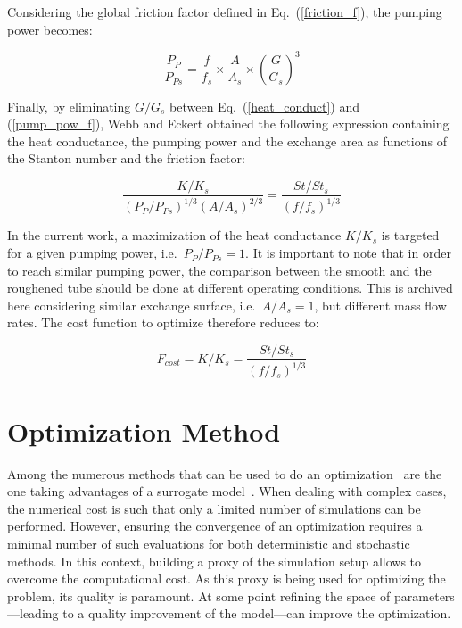 Considering the global friction factor defined in Eq.~(\ref{friction_f}), the pumping power becomes:

\begin{equation}
\frac{P_{P}}{P_{Ps}} = \frac{f}{f_s} \times \frac{A}{A_s} \times \left( \frac{G}{G_s} \right)^3
\label{pump_pow_f}
\end{equation}

Finally, by eliminating $G/G_s$ between Eq.~(\ref{heat_conduct}) and (\ref{pump_pow_f}), Webb and Eckert obtained the following expression containing the heat conductance, the pumping power and the exchange area as functions of the Stanton number and the friction factor:

\begin{equation}
\frac{K/K_s}{(P_{P}/P_{Ps})^{1/3}(A/A_s)^{2/3}} = \frac{St/St_s}{(f/f_s)^{1/3}}
\label{webb_eckert}
\end{equation}

In the current work, a maximization of the heat conductance $K/K_s$ is targeted for a given pumping power, i.e.~$P_{P}/P_{Ps}=1$. It is important to note that in order to reach similar pumping power, the comparison between the smooth and the roughened tube should be done at different operating conditions. This is archived here considering similar exchange surface, i.e.~$A/A_s=1$, but different mass flow rates. The cost function to optimize therefore reduces to:

\begin{equation}
F_{cost} = K/K_s = \frac{St/St_s}{(f/f_s)^{1/3}}
\label{cost_function}
\end{equation}

\section{Optimization Method}
\label{sec:optim_method}

Among the numerous methods that can be used to do an optimization~\cite{Cavazzuti2013} are the one taking advantages of a surrogate model~\cite{Forrester2009}. When dealing with complex cases, the numerical cost is such that only a limited number of simulations can be performed. However, ensuring the convergence of an optimization requires a minimal number of such evaluations for both deterministic and stochastic methods. In this context, building a proxy of the simulation setup allows to overcome the computational cost. As this proxy is being used for optimizing the problem, its quality is paramount. At some point refining the space of parameters---leading to a quality improvement of the model---can improve the optimization.

